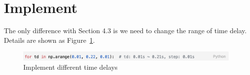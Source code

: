 \section{Implement} %
The only difference with Section 4.3 is we need to change the range of time delay. Details are shown as Figure~\ref{5_3_code}. \\

\begin{figure}[htbp]
\centering
\includegraphics[width = .999\textwidth]{figure/5_3_code.png}
\caption{Implement different time delays}
\label{5_3_code}
\end{figure}